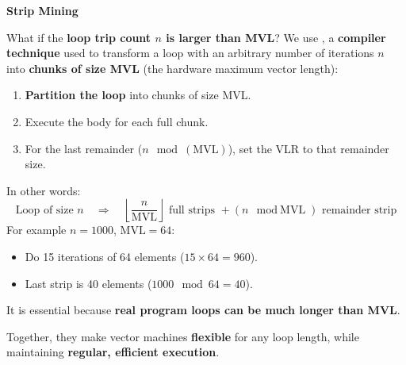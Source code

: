 \highspace
\begin{flushleft}
    \textcolor{Green3}{ \textbf{Strip Mining}}
\end{flushleft}
What if the \textbf{loop trip count $n$ is larger than MVL}? We use , a \textbf{compiler technique} used to transform a loop with an arbitrary number of iterations $n$ into \textbf{chunks of size MVL} (the hardware maximum vector length):
\begin{enumerate}
    \item \textbf{Partition the loop} into chunks of size MVL.
    \item Execute the body for each full chunk.
    \item For the last remainder ($n \mod \left(\text{MVL}\right)$), set the VLR to that remainder size.
\end{enumerate}
In other words:
\begin{equation}
    \text{Loop of size } n \quad \Rightarrow \quad \left\lfloor \dfrac{n}{\text{MVL}} \right\rfloor \text{ full strips } + \left(n \mod \text{MVL}\right) \text{ remainder strip}
\end{equation}
For example $n = 1000$, $\text{MVL} = 64$:
\begin{itemize}
    \item Do 15 iterations of 64 elements ($15 \times 64 = 960$).
    \item Last strip is 40 elements ($1000 \mod 64 = 40$).
\end{itemize}
It is essential because \textbf{real program loops can be much longer than MVL}.

\highspace
Together, they make vector machines \textbf{flexible} for any loop length, while maintaining \textbf{regular, efficient execution}.